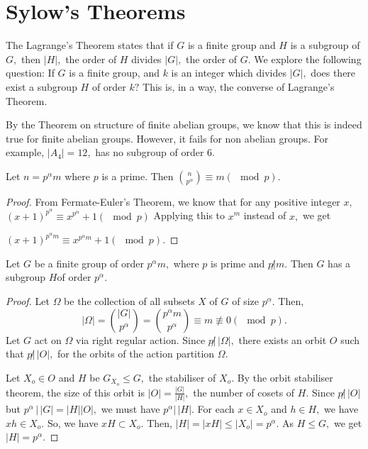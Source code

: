 \section{Sylow's Theorems}
The Lagrange's Theorem states that if $G$ is a finite group and $H$ is a subgroup of $G,$
then $ \lvert H \rvert,$ the order of $H$ divides $ \lvert G \rvert,$ the order of $G.$
We explore the following question: If $G$ is a finite group, and $k$ is an integer
which divides $ \lvert G \rvert ,$ does there exist a subgroup $H$ of order $k?$
This is, in a way, the converse of Lagrange's Theorem.

By the Theorem on structure of finite abelian groups, we know that this is indeed true
for finite abelian groups.
However, it fails for non abelian groups. For example, $ \lvert A_{4} \rvert = 12,$
has no subgroup of order 6.

\begin{lemma}
	Let $ n = p^{\alpha} m$ where $p$ is a prime.
	Then $ \binom{n}{p^{\alpha}} \equiv m (\mod p).$
\end{lemma}

\begin{proof}
	From Fermate-Euler's Theorem, we know that for any positive integer
	$x,$
	$ (x+1)^{p ^\alpha} \equiv x^{p^\alpha} + 1 (\mod p) $	
	Applying this to $x^m $ instead of $x,$ we get

	$ (x+1)^{p ^\alpha m} \equiv x^{p^\alpha m} + 1 (\mod p) .$

\end{proof}

\begin{theorem}
Let $G$ be a finite group of order $p^{\alpha}m,$ where $p$ is prime and $p \not |m.$
Then $G$ has a subgroup $H$of order $p^{\alpha}.$
\end{theorem}

\begin{proof}
	Let $\Omega$ be the collection of all subsets $X$ of $G$ of size $p^\alpha.$
	Then,
	$$ \lvert \Omega \rvert = \binom{ \lvert G \rvert }{p^\alpha}
	= \binom{p^\alpha m} {p^\alpha }
	\equiv m \not \equiv 0 ( \mod p).$$
	Let $G$ act on $ \Omega $ via right regular action.
	Since $p \not  | \, \lvert \Omega \rvert ,$ there exists an orbit 
	$O$ such that $p \not |\, \lvert O \rvert,$
	for the orbits of the action partition $ \Omega. $

	Let $X_o \in O$ and $H $ be $ G _{X_o} \leq G,$ the stabiliser of $X_o.$
	By the orbit stabiliser theorem, the size of this orbit is
	$ \lvert O \rvert =  \frac{ \lvert G  \rvert }{ \lvert H \rvert },$
	the number of cosets of $H.$
	Since $p \not | \, \lvert O \rvert$
	but $p^\alpha \, | \, \lvert G \rvert = \lvert H \rvert \lvert O \rvert,$
	we must have $p^{\alpha} | \, \lvert H \rvert.$
	For each $ x \in X_o$ and $ h \in H,$ we have $ xh \in X_o.$
	So, we have $x H \subset X_o.$
	Then,
	$ \lvert H \rvert = \lvert x H \rvert \leq \lvert X_o \rvert = p^\alpha.$
	As $H \leq G,$ we get $ \lvert H \rvert = p^\alpha.$

\end{proof}

